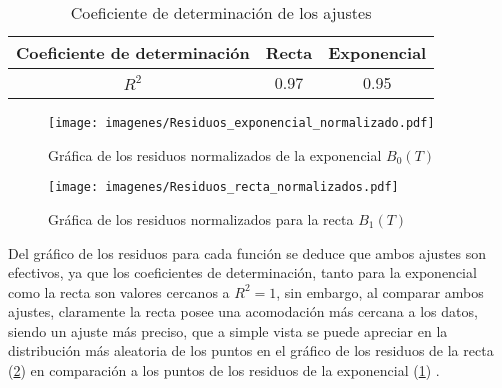 \begin{table}[h!]
    \centering
    \begin{tabular}{|c|c|c|}
    \hline
      Coeficiente de determinación &   Recta & Exponencial \\
         \hline
          $R^2$ & 0.97& 0.95 \\
          \hline
    \end{tabular}
    \caption{Coeficiente de determinación de los ajustes}
    \label{tabla de residuos}
\end{table}












\begin{figure}[h!]
    \centering
    \texttt{[image: imagenes/Residuos\_exponencial\_normalizado.pdf]}
    \caption{Gráfica de los residuos normalizados de la exponencial $B_0 (T)$}
    \label{Residuos-exponencial}
\end{figure}



\begin{figure}[h!]
    \centering
    \texttt{[image: imagenes/Residuos\_recta\_normalizados.pdf]}
    \caption{Gráfica de los residuos normalizados para la recta $B_1(T)$}
    \label{Residuos_recta}
\end{figure}

Del gráfico de los residuos para cada función se deduce que ambos ajustes son efectivos, ya que los coeficientes de determinación, tanto para la exponencial como la recta son valores cercanos a $R^2=1$, sin embargo, al comparar ambos ajustes, claramente la recta posee una acomodación más cercana a los datos, siendo un ajuste más preciso, que a simple vista se puede apreciar en la distribución más aleatoria de los puntos en el gráfico de los residuos de la recta (\ref{Residuos_recta}) en comparación a los puntos de los residuos de la exponencial (\ref{Residuos-exponencial}) .









